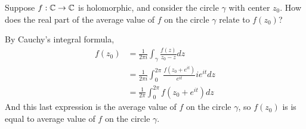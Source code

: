 \documentclass{homework}
\begin{document}
                                                                                                       \begin{problem}
                                                                                                          Suppose $f : \mathbb{C} \to \mathbb{C}$ is holomorphic, and consider the circle
                                                                                                             $\gamma$ with center $z_0$.  How does the real part of the average
                                                                                                                value of $f$ on the circle $\gamma$ relate to $f(z_0)$?
                                                                                                                 \end{problem}
                                                                                                                 \begin{solution}
                                                                                                                 By Cauchy's integral formula, 
                                                                                                                 \begin{align*}
                                                                                                                 f(z_0) &= \frac{1}{2\pi i}\int_{\gamma} \frac{f(z)}{z_0 - z}dz\\
                                                                                                                 &= \frac{1}{2\pi i}\int_{0}^{2\pi} \frac{f(z_0 + e^{it})}{e^{it}}ie^{it} dz\\
                                                                                                                 &= \frac{1}{2\pi}\int_{0}^{2\pi} f(z_0 + e^{it}) dz
                                                                                                                 \end{align*}
                                                                                                                 And this last expression is the average value of $f$ on the circle $\gamma$, so $f(z_0)$ is is equal to average value of $f$ on the circle $\gamma$.

                                                                                                                 \end{solution}
\end{document}
